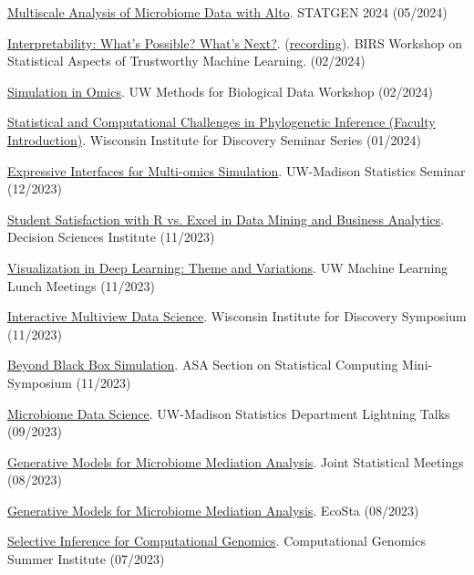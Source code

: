 \documentclass[letterpaper]{article}
\renewenvironment{itemize}{
  \begin{list}{}{
    \setlength{\leftmargin}{1.5em}
  }
}{
  \end{list}
}
\begin{document}
\begin{itemize}
  \item \href{https://krisrs1128.github.io/talks/2024/20240503/20240503.html#1}{Multiscale Analysis of Microbiome Data with Alto}. STATGEN 2024 (05/2024)
  \item \href{https://krisrs1128.github.io/talks/2024/20240212/20240212.html}{Interpretability: What's Possible? What's Next?}. (\href{https://www.birs.ca/events/2024/5-day-workshops/24w5284/videos/watch/202402120904-Sankaran.html}{recording}). BIRS Workshop on Statistical Aspects of Trustworthy Machine Learning. (02/2024)
  \item \href{https://github.com/krisrs1128/talks/blob/master/2024/20240207/20240207.Rmd}{Simulation in Omics}. UW Methods for Biological Data Workshop (02/2024)
  \item \href{https://krisrs1128.github.io/talks/2024/20240131/20240131.html#1}{Statistical and Computational Challenges in Phylogenetic Inference (Faculty Introduction)}. Wisconsin Institute for Discovery Seminar Series (01/2024)
  \item \href{https://go.wisc.edu/4y9176}{Expressive Interfaces for Multi-omics Simulation}. UW-Madison Statistics Seminar (12/2023)
  \item \href{https://github.com/krisrs1128/talks/blob/master/2023/20231118/dsi-kris.pptx}{Student Satisfaction with R vs. Excel in Data Mining and Business Analytics}. Decision Sciences Institute (11/2023)
  \item \href{https://go.wisc.edu/9p83o9}{Visualization in Deep Learning: Theme and Variations}. UW Machine Learning Lunch Meetings (11/2023)
  \item \href{https://go.wisc.edu/02jao8}{Interactive Multiview Data Science}. Wisconsin Institute for Discovery Symposium (11/2023)
  \item \href{https://go.wisc.edu/fg7wr4}{Beyond Black Box Simulation}. ASA Section on Statistical Computing Mini-Symposium (11/2023)
  \item \href{https://go.wisc.edu/uhka79}{Microbiome Data Science}. UW-Madison Statistics Department Lightning Talks (09/2023)
  \item \href{https://drive.google.com/file/d/1lQBb665vsyILnknqMdGZMPkj-7Nhhgqw/view?usp=drive_link}{Generative Models for Microbiome Mediation Analysis}. Joint Statistical Meetings (08/2023)
  \item \href{https://go.wisc.edu/77q6rs}{Generative Models for Microbiome Mediation Analysis}. EcoSta (08/2023)
  \item \href{https://go.wisc.edu/7l1k95}{Selective Inference for Computational Genomics}. Computational Genomics Summer Institute (07/2023)

\end{itemize}
\end{document}
